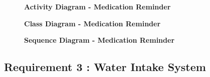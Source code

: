 \documentclass{article}
\begin{document}
\clearpage


\begin{figure}[htbp]
	\textbf{Activity Diagram - Medication Reminder }
	\centering
	\begin{subfigure}{\textwidth}
		\resizebox{\textwidth}{!}{}
	\end{subfigure}
	\begin{subfigure}{\textwidth}
	\end{subfigure}
\end{figure}

\clearpage

\begin{figure}[htbp]
	\textbf{Class Diagram - Medication Reminder}
	\centering
	\begin{subfigure}{\textwidth}
		\resizebox{\textwidth}{!}{}
	\end{subfigure}
	\begin{subfigure}{\textwidth}
	\end{subfigure}
\end{figure}

\clearpage

\begin{figure}[htbp]
	\textbf{Sequence Diagram - Medication Reminder}
	\centering
	\begin{subfigure}{\textwidth}
		\resizebox{\textwidth}{!}{}
	\end{subfigure}
	\begin{subfigure}{\textwidth}
	\end{subfigure}
\end{figure}

\clearpage


\subsection{Requirement 3 : Water Intake System}
\end{document}
